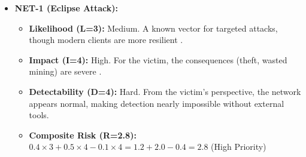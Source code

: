 \begin{itemize}
    \item \textbf{NET-1 (Eclipse Attack):}
    \begin{itemize}
        \item \textbf{Likelihood (L=3):} Medium. A known vector for targeted attacks, though modern clients are more resilient \cite{wang2019}.
        \item \textbf{Impact (I=4):} High. For the victim, the consequences (theft, wasted mining) are severe \cite{eyal2014}.
        \item \textbf{Detectability (D=4):} Hard. From the victim's perspective, the network appears normal, making detection nearly impossible without external tools.
        \item \textbf{Composite Risk (R=2.8):} $0.4 \times 3 + 0.5 \times 4 - 0.1 \times 4 = 1.2 + 2.0 - 0.4 = 2.8$ (High Priority)
    \end{itemize}
\end{itemize}